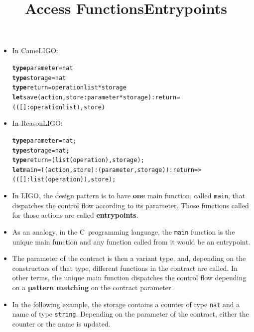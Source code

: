 \documentclass[wide]{slides}
\newcommand{\Ktype}[0]{\textbf{type}\xspace}
\newcommand{\Klet}[0]{\textbf{let}\xspace}
\begin{document}
\begin{slide}
  \title{Access Functions}

  \begin{itemize}

    \item In CameLIGO:
      \begin{alltt}
\Ktype parameter = nat
\Ktype storage = nat
\Ktype return = operation list * storage
\Klet save (action, store: parameter * storage) : return =
  (([] : operation list), store)
      \end{alltt}

    \item In ReasonLIGO:
      \begin{alltt}
\Ktype parameter = nat;
\Ktype storage = nat;
\Ktype return = (list (operation), storage);
\Klet main = ((action, store): (parameter, storage)) : return =>
  (([] : list (operation)), store);
      \end{alltt}

  \end{itemize}

\end{slide}


\begin{slide}
  \title{Entrypoints}

  \begin{itemize}

    \item In LIGO, the design pattern is to have \textbf{one} main
      function, called \texttt{main}, that dispatches the control flow
      according to its parameter. Those functions called for those
      actions are called \textbf{entrypoints}.

    \item As an analogy, in the C~programming language, the
      \texttt{main} function is the unique main function and any
      function called from it would be an entrypoint.

    \item The parameter of the contract is then a variant type, and,
      depending on the constructors of that type, different functions
      in the contract are called. In other terms, the unique main
      function dispatches the control flow depending on a
      \textbf{pattern matching} on the contract parameter.

    \item In the following example, the storage contains a counter of
      type \texttt{nat} and a name of type \texttt{string}. Depending
      on the parameter of the contract, either the counter or the name
      is updated.

  \end{itemize}

\end{slide}
\end{document}
